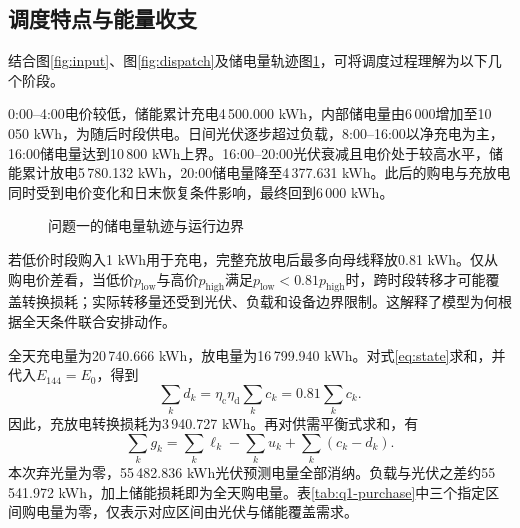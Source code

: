 \subsection{调度特点与能量收支}
结合图\ref{fig:input}、图\ref{fig:dispatch}及储电量轨迹图\ref{fig:soc}，可将调度过程理解为以下几个阶段。

0:00--4:00电价较低，储能累计充电4\,500.000 kWh，内部储电量由6\,000增加至10\,050 kWh，为随后时段供电。日间光伏逐步超过负载，8:00--16:00以净充电为主，16:00储电量达到10\,800 kWh上界。16:00--20:00光伏衰减且电价处于较高水平，储能累计放电5\,780.132 kWh，20:00储电量降至4\,377.631 kWh。此后的购电与充放电同时受到电价变化和日末恢复条件影响，最终回到6\,000 kWh。
\begin{figure}[H]
  \centering
  \caption{问题一的储电量轨迹与运行边界}
  \label{fig:soc}
\end{figure}

若低价时段购入1 kWh用于充电，完整充放电后最多向母线释放0.81 kWh。仅从购电价差看，当低价$p_{\mathrm{low}}$与高价$p_{\mathrm{high}}$满足$p_{\mathrm{low}}<0.81p_{\mathrm{high}}$时，跨时段转移才可能覆盖转换损耗；实际转移量还受到光伏、负载和设备边界限制。这解释了模型为何根据全天条件联合安排动作。

全天充电量为20\,740.666 kWh，放电量为16\,799.940 kWh。对式\eqref{eq:state}求和，并代入$E_{144}=E_0$，得到
\begin{equation}
  \sum_k d_k=\eta_{\mathrm c}\eta_{\mathrm d}\sum_k c_k
  =0.81\sum_k c_k.
  \label{eq:roundtrip}
\end{equation}
因此，充放电转换损耗为3\,940.727 kWh。再对供需平衡式求和，有
\begin{equation}
  \sum_k g_k=\sum_k\ell_k-\sum_k u_k+\sum_k(c_k-d_k).
  \label{eq:dailybalance}
\end{equation}
本次弃光量为零，55\,482.836 kWh光伏预测电量全部消纳。负载与光伏之差约55\,541.972 kWh，加上储能损耗即为全天购电量。表\ref{tab:q1-purchase}中三个指定区间购电量为零，仅表示对应区间由光伏与储能覆盖需求。
\FloatBarrier
